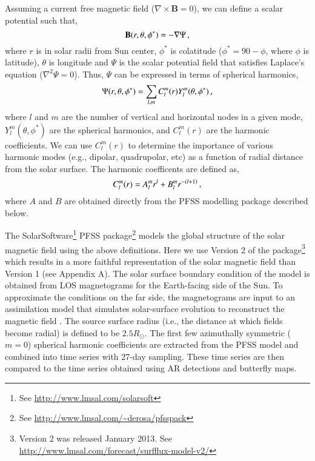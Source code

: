 \documentclass[namedreferences]{solarphysics}
\begin{document}
\begin{article}
Assuming a current free magnetic field ($\nabla\times\mathbf{B}=0$), we can define a scalar potential such that,
\begin{equation}
\mathbf{B}(r,\theta,\phi^*)=-\nabla \Psi \mbox{\,,}
\end{equation}
where $r$ is in solar radii from Sun center, $\phi^*$ is colatitude ($\phi^*=90-\phi$, where $\phi$ is latitude), $\theta$ is longitude and $\Psi$ is the scalar potential field 
that satisfies Laplace's equation ($\nabla^2 \Psi = 0$). Thus, $\Psi$ can be expressed in terms of spherical harmonics,
\begin{equation}\label{eqn_harm_coeff}
\Psi(r,\theta,\phi^*)=\sum_{l,m}C_{l}^{m}(r)Y_{l}^{m}(\theta,\phi^*) \mbox{\,,}
\end{equation}
where $l$ and $m$ are the number of vertical and horizontal nodes in a given mode, $Y_{l}^{m}(\theta,\phi^*)$ are the spherical harmonics, and $C_{l}^{m}(r)$ are the harmonic coefficients. We can use $C_{l}^{m}(r)$ to determine the importance of various harmonic modes (e.g., dipolar, quadrupolar, etc) as a function of radial distance from the solar surface. The harmonic coefficents are defined as,
\begin{equation}\label{eqn:harmcoeff}
C_{l}^{m}(r) = A^m_l r^l + B^m_l r^{-(l+1)} \mbox{\,,}
\end{equation}
where $A$ and $B$ are obtained directly from the PFSS modelling package described below. 

The SolarSoftware\footnote{See \url{http://www.lmsal.com/solarsoft}} \citep[SSW;][]{Freeland:1998} PFSS package\footnote{See \url{http://www.lmsal.com/~derosa/pfsspack}} \citep{Schrijver:2003} models the global structure of the solar magnetic field using the above definitions. Here we use Version 2 of the package\footnote{Version 2 was released January 2013. See \url{http://www.lmsal.com/forecast/surfflux-model-v2/}} which results in a more faithful representation of the solar magnetic field than Version 1 (see Appendix A).
The solar surface boundary condition of the model is obtained from LOS magnetograms for the Earth-facing side of the Sun. To approximate the conditions on the far side, the magnetograms are input to an assimilation model that simulates solar-surface evolution to reconstruct the magnetic field \citep{Schrijver:2003}. The source surface radius (i.e., the distance at which fields become radial) is defined to be $2.5R_{\odot}$. The first few azimuthally symmetric ($m=0$) spherical harmonic coefficients are extracted from the PFSS model and combined into time series with 27-day sampling. These time series are then compared to the time series obtained using AR detections and butterfly maps.



\end{article}
\end{document}
